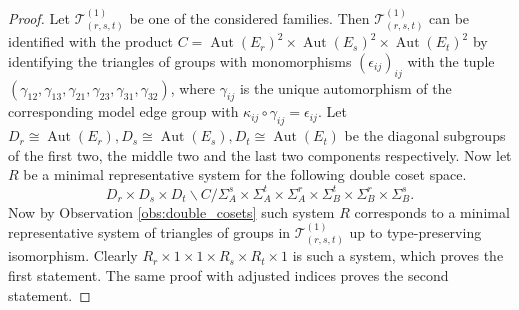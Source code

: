\documentclass[dvipsnames]{article}
\theoremstyle{definition}
\theoremstyle{remark}
\DeclareMathOperator{\Aut}{Aut}
\begin{document}
    \begin{proof}
        Let $\mathcal T_{(r,s,t)}^{(1)}$ be one of the considered families. Then $\mathcal T_{(r,s,t)}^{(1)}$ can be identified with the product
        $C = \Aut(E_r)^2 \times \Aut(E_s)^2 \times \Aut(E_t)^2$
        by identifying the triangles of groups with monomorphisms $(\epsilon_{ij})_{ij}$ with the tuple $(\gamma_{12},\allowbreak \gamma_{13},\allowbreak \gamma_{21},\allowbreak \gamma_{23},\allowbreak \gamma_{31},\allowbreak \gamma_{32})$, where $\gamma_{ij}$ is the unique automorphism of the corresponding model edge group with $\kappa_{ij} \circ \gamma_{ij} = \epsilon_{ij}$.
        Let $D_r \cong \Aut(E_r), D_s\cong \Aut(E_s), D_t \cong \Aut(E_t)$ be the diagonal subgroups of the first two, the middle two and the last two components respectively. Now let $R$ be a minimal representative system for the following double coset space.
        \[
            D_r \times D_s \times D_t
            \backslash C /
            \Sigma_A^s\times \Sigma_A^t \times \Sigma_A^r \times \Sigma_B^t \times \Sigma_B^r \times \Sigma_B^s.
        \]
        Now by Observation \ref{obs:double_cosets} such system $R$ corresponds to a minimal representative system of triangles of groups in $\mathcal T_{(r,s,t)}^{(1)}$ up to type-preserving isomorphism. Clearly $R_r \times 1 \times 1 \times R_s \times R_t \times 1$ is such a system, which proves the first statement. The same proof with adjusted indices proves the second statement.
    \end{proof}
    
\end{document}

